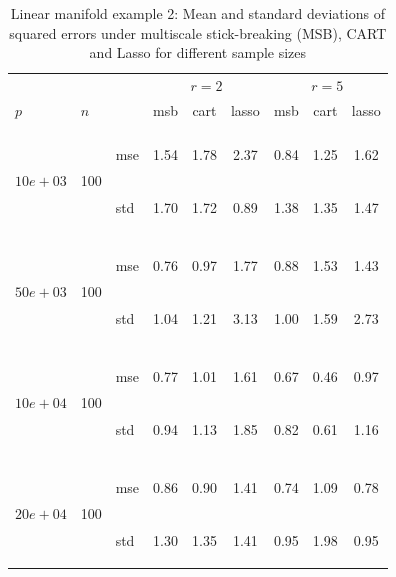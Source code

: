 \documentclass{article} %
\newcommand{\efoo}{\end{footnotesize}}
\newcommand{\bfoo}{\begin{footnotesize}}
\begin{document}
\begin{table}[t]
\caption{Linear manifold example 2: Mean and standard deviations of squared errors under multiscale stick-breaking (MSB), CART and Lasso for different sample sizes}\label{table:linear2}
\vskip 0.15in
\begin{center}
\begin{small}
\begin{sc}
\begin{tabular}{lllcccccc}
\hline
&&&\multicolumn{3}{c}{$r=2$}&\multicolumn{3}{c}{$r=5$}\\
$p$&$n$& & msb&cart&lasso & msb&cart&lasso \\
\\

\multirow{2}{*}{$10e+03$}&\multirow{2}{*}{100}&\bfoo mse\efoo&1.54 &1.78&2.37&0.84&1.25&1.62\\
&&\bfoo std\efoo &1.70&1.72&0.89&1.38&1.35&1.47\\


\\
\multirow{2}{*}{$50e+03$}&\multirow{2}{*}{100}&\bfoo mse\efoo&0.76&0.97&1.77&0.88&1.53&1.43\\
&&\bfoo std\efoo &1.04&1.21&3.13&1.00&1.59&2.73\\

\\

\multirow{2}{*}{$10e+04$}&\multirow{2}{*}{100}&\bfoo mse\efoo&0.77 &1.01&1.61&0.67&0.46&0.97\\
&&\bfoo std\efoo &0.94&1.13&1.85&0.82&0.61&1.16\\
\\

\multirow{2}{*}{$20e+04$}&\multirow{2}{*}{100}&\bfoo mse\efoo&0.86&0.90&1.41&0.74&1.09&0.78\\
&&\bfoo std\efoo &1.30&1.35&1.41&0.95&1.98&0.95\\
%
\hline
\end{tabular}
\end{sc}
\end{small}
\end{center}
\vskip -0.1in
\end{table}
\end{document}
